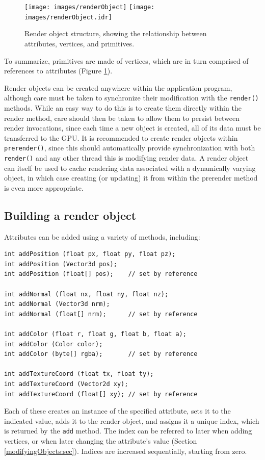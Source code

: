 %
\begin{figure}[t]
\begin{center}
\iflatexml
 \texttt{[image: images/renderObject]}
\else
 \texttt{[image: images/renderObject.idr]}
\fi
\end{center}
\caption{Render object structure, showing the relationship between
attributes, vertices, and primitives.}
\label{renderObject:fig}
\end{figure}
%

To summarize, primitives are made of vertices, which are in turn
comprised of references to attributes (Figure \ref{renderObject:fig}).

Render objects can be created anywhere within the application program,
although care must be taken to synchronize their modification with the
{\tt render()} methods. While an easy way to do this is to create them
directly within the render method, care should then be taken to allow
them to persist between render invocations, since each time a new
object is created, all of its data must be transferred to the GPU. It
is recommended to create render objects within {\tt prerender()},
since this should automatically provide synchronization with both {\tt
render()} and any other thread this is modifying render data.  A
render object can itself be used to cache rendering data associated
with a dynamically varying object, in which case creating (or
updating) it from within the prerender method is even more
appropriate.

\subsection{Building a render object}
\label{buildingRenderObjects:sec}

Attributes can be added using a variety of
 methods, including:
%
\begin{lstlisting}[]
int addPosition (float px, float py, float pz);
int addPosition (Vector3d pos);
int addPosition (float[] pos);    // set by reference

int addNormal (float nx, float ny, float nz);
int addNormal (Vector3d nrm);
int addNormal (float[] nrm);      // set by reference

int addColor (float r, float g, float b, float a);
int addColor (Color color);
int addColor (byte[] rgba);       // set by reference

int addTextureCoord (float tx, float ty);
int addTextureCoord (Vector2d xy);
int addTextureCoord (float[] xy); // set by reference
\end{lstlisting}
%
Each of these creates an instance of the specified attribute, sets it
to the indicated value, adds it to the render object, and assigns it a
unique index, which is returned by the {\tt add} method. The index can
be referred to later when adding vertices, or when later changing the
attribute's value (Section \ref{modifyingObjects:sec}). Indices are
increased sequentially, starting from zero.

